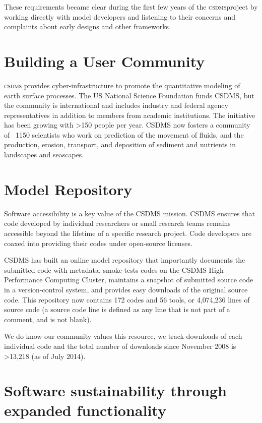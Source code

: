 \documentclass[11pt, oneside]{amsart}
\DeclareRobustCommand{\csdms}{\textsc{csdms}}
\begin{document}
These requirements became clear during the first few years of the \csdms project
by working directly with model developers and listening to their concerns and
complaints about early designs and other frameworks.

\section{Building a User Community}

\csdms{} provides cyber-infrastructure to promote the quantitative modeling of
earth surface processes. The US National Science Foundation funds CSDMS, but
the community is international and includes industry and federal agency
representatives in addition to members from academic institutions. The
initiative has been growing with >150 people per year. CSDMS now fosters a
community of ~1150 scientists who work on prediction of the movement of fluids,
and the production, erosion, transport, and deposition of sediment and
nutrients in landscapes and seascapes. 

\section{Model Repository}

Software accessibility is a key value of the CSDMS mission. CSDMS ensures that code developed by individual researchers or small research teams remains accessible beyond the lifetime of a specific research project. Code developers are coaxed into providing their codes under open-source licenses. 

CSDMS has built an online model repository that importantly documents the submitted code with metadata, smoke-tests codes on the CSDMS High Performance Computing Cluster, maintains a snapshot of submitted source code in a version-control system, and provides easy downloads of the original source code. This repository now contains 172 codes and 56 tools, or 4,074,236 lines of source code (a source code line is defined as any line that is not part of a comment, and is not blank).

We do know our community values this resource, we track downloads of each individual code and the total number of downloads since November 2008 is >13,218 (as of July 2014).

\section{Software sustainability through expanded functionality}
\end{document}
